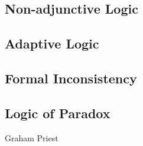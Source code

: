 \subsection{Non-adjunctive Logic}\label{sec:nonadjunctive_logic}

\subsection{Adaptive Logic}\label{sec:adaptive_logic}

\subsection{Formal Inconsistency}\label{sec:formal_inconsistency}

\subsection{Logic of Paradox}\label{sec:logic_of_paradox}

Graham Priest
